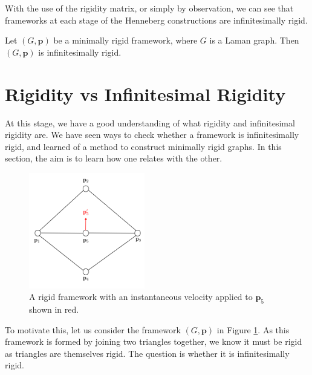 \begin{flushleft}
With the use of the rigidity matrix, or simply by observation, we can see that frameworks at each stage of the Henneberg constructions are infinitesimally rigid. 
\end{flushleft}

\begin{corollary}
\label{cor: laman => inf rigid}
Let $(G,\mathbf{p})$ be a minimally rigid framework, where $G$ is a Laman graph. Then $(G,\mathbf{p})$ is infinitesimally rigid.
\end{corollary}

\section{Rigidity vs Infinitesimal Rigidity} 

\begin{flushleft}
At this stage, we have a good understanding of what rigidity and infinitesimal rigidity are. We have seen ways to check whether a framework is infinitesimally rigid, and learned of a method to construct minimally rigid graphs. In this section, the aim is to learn how one relates with the other. 
\end{flushleft}

\begin{figure}[htbp]
    \centering
    \includegraphics[width = 0.45\textwidth]{Chapter 3/6. rigid but not inf rigid.png}
    \caption{A rigid framework with an instantaneous velocity applied to $\mathbf{p}_5$ shown in red.}
    \label{fig: rigid but not inf rigid}
\end{figure}
\vspace{-4 mm}
\begin{flushleft}
To motivate this, let us consider the framework $(G,\mathbf{p})$ in Figure \ref{fig: rigid but not inf rigid}. As this framework is formed by joining two triangles together, we know it must be rigid as triangles are themselves rigid. The question is whether it is infinitesimally rigid. 
\end{flushleft}

